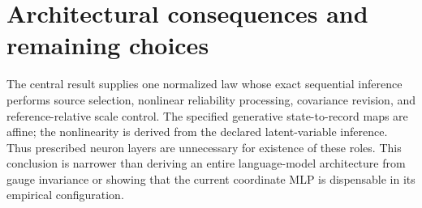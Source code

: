 \documentclass[11pt]{article}
\begin{document}
\section{Architectural consequences and remaining choices}
\label{sec:choices}

The central result supplies one normalized law whose exact sequential inference performs source selection, nonlinear reliability processing, covariance revision, and reference-relative scale control. The specified generative state-to-record maps are affine; the nonlinearity is derived from the declared latent-variable inference. Thus prescribed neuron layers are unnecessary for existence of these roles. This conclusion is narrower than deriving an entire language-model architecture from gauge invariance or showing that the current coordinate MLP is dispensable in its empirical configuration.
\end{document}
